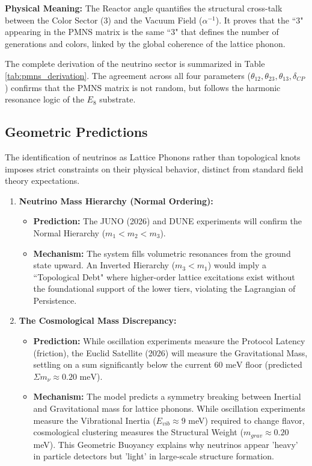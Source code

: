 \textbf{Physical Meaning:} The Reactor angle quantifies the structural cross-talk between the Color Sector (3) and the Vacuum Field ($\alpha^{-1}$). It proves that the ``3" appearing in the PMNS matrix is the same ``3" that defines the number of generations and colors, linked by the global coherence of the lattice phonon.

The complete derivation of the neutrino sector is summarized in Table \ref{tab:pmns_derivation}. The agreement across all four parameters ($\theta_{12}, \theta_{23}, \theta_{13}, \delta_{CP}$) confirms that the PMNS matrix is not random, but follows the harmonic resonance logic of the $E_8$ substrate.



\subsection{Geometric Predictions}

The identification of neutrinos as Lattice Phonons rather than topological knots imposes strict constraints on their physical behavior, distinct from standard field theory expectations.

\begin{enumerate}
    \item \textbf{Neutrino Mass Hierarchy (Normal Ordering):}
    \begin{itemize}
        \item \textbf{Prediction:} The JUNO (2026) and DUNE experiments will confirm the Normal Hierarchy ($m_1 < m_2 < m_3$).
        \item \textbf{Mechanism:} The system fills volumetric resonances from the ground state upward. An Inverted Hierarchy ($m_3 < m_1$) would imply a ``Topological Debt" where higher-order lattice excitations exist without the foundational support of the lower tiers, violating the Lagrangian of Persistence.
    \end{itemize}

    \item \textbf{The Cosmological Mass Discrepancy:}
    \begin{itemize}
        \item \textbf{Prediction:} While oscillation experiments measure the Protocol Latency (friction), the Euclid Satellite (2026) will measure the Gravitational Mass, settling on a sum significantly below the current $60 \text{ meV}$ floor (predicted $\Sigma m_\nu \approx 0.20 \text{ meV}$).
        \item \textbf{Mechanism:} The model predicts a symmetry breaking between Inertial and Gravitational mass for lattice phonons. While oscillation experiments measure the Vibrational Inertia ($E_{vib} \approx 9$ meV) required to change flavor, cosmological clustering measures the Structural Weight ($m_{grav} \approx 0.20$ meV). This Geometric Buoyancy explains why neutrinos appear 'heavy' in particle detectors but 'light' in large-scale structure formation.
    \end{itemize}
\end{enumerate}

